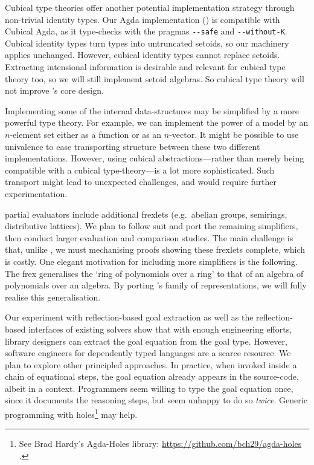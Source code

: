 Cubical type theories offer another potential implementation strategy
through non-trivial identity types.  Our Agda implementation
(\Fragmentlib) is compatible with Cubical Agda, as it type-checks with
the pragmas \texttt{-{}-safe} and \texttt{-{}-without-K}. Cubical identity types
turn types
into untruncated setoids, so our machinery applies unchanged.
However, cubical identity types cannot replace setoids.
Extracting intensional information is desirable and relevant  for cubical type theory too, so
we will still
implement setoid algebras. So cubical type theory will not
improve \Frexlib{}'s core design.

Implementing some of the internal data-structures may be
simplified by a more powerful type theory. For example, we can
implement the power of a model by an $n$-element set either as a
function or as an $n$-vector. It might be possible to use univalence
to ease transporting structure between these two different
implementations. However, using cubical abstractions---rather than
merely being compatible with a cubical type-theory---is a lot more
sophisticated. Such transport might lead to unexpected challenges, and
would require further experimentation.

 partial
evaluators include additional frexlets (e.g.~abelian groups,
semirings, distributive lattices). We plan to follow suit and port the
remaining simplifiers, then conduct larger evaluation and comparison studies.
The main challenge is that, unlike
\citeauthor{yallop-et-al:partially-static-data-as-frex}, we must
mechanising proofs showing these frexlets complete, which is costly.
One elegant motivation for including more
simplifiers is the following. The frex generalises the `ring of
polynomials over a ring' to that of an algebra of polynomials over an
algebra. By porting
\citeauthor{yallop-et-al:partially-static-data-as-frex}'s family of
representations, we will fully realise this generalisation.

Our experiment with reflection-based goal extraction as well as the reflection-based
interfaces of existing solvers show that with enough engineering
efforts, library designers can extract the goal equation from the goal
type. However, software engineers for dependently typed
languages are a scarce resource. We plan to explore other principled
approaches. In practice, when invoked inside a chain of equational
steps, the goal equation already appears in the source-code, albeit in
a context. Programmers seem willing to type the goal
equation once, since it documents the reasoning steps, but seem
unhappy to do so \emph{twice}. Generic
programming with holes\footnote{See Brad Hardy's Agda-Holes library:
  \url{https://github.com/bch29/agda-holes} .} may help.

